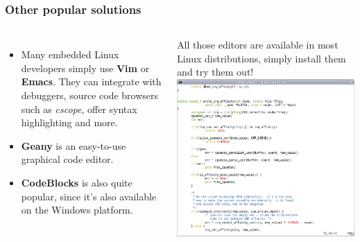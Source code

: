 \begin{frame}
  \frametitle{Other popular solutions}
  \begin{columns}[T]
    \begin{itemize}
    \item Many embedded Linux developers simply use {\bf Vim} or {\bf
        Emacs}. They can integrate with debuggers, source code browsers
      such as {\em cscope}, offer syntax highlighting and more.
    \item {\bf Geany} is an easy-to-use graphical code editor.
    \item {\bf CodeBlocks} is also quite popular, since it's also
      available on the Windows platform.
    \end{itemize}
    All those editors are available in most Linux distributions, simply
    install them and try them out!
    \includegraphics[width=\textwidth]{slides/sysdev-application-development/vim-screenshot.png}\\

\end{columns}
\end{frame}
